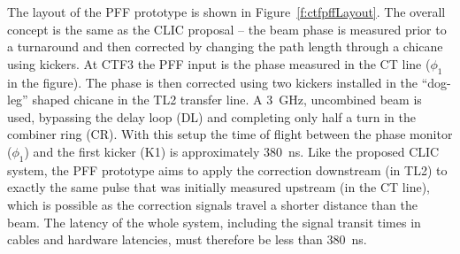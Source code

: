 The layout of the PFF prototype is shown in Figure~\ref{f:ctfpffLayout}. The overall concept is the same as the CLIC proposal -- the beam phase is measured prior to a turnaround and then corrected by changing the path length through a chicane using kickers. At CTF3 the PFF input is the phase measured in the CT line (\(\phi_1\) in the figure). The phase is then corrected using two kickers installed in the ``dog-leg'' shaped chicane in the TL2 transfer line.  A 3~GHz, uncombined beam is used, bypassing the delay loop (DL) and completing only half a turn in the combiner ring (CR). With this setup the time of flight between the phase monitor (\(\phi_1\)) and the first kicker (K1) is approximately 380~ns. Like the proposed CLIC system, the PFF prototype aims to apply the correction downstream (in TL2) to exactly the same pulse that was initially measured upstream (in the CT line), which is possible as the correction signals travel a shorter distance than the beam. The latency of the whole system, including the signal transit times in cables and hardware latencies, must therefore be less than 380~ns.


